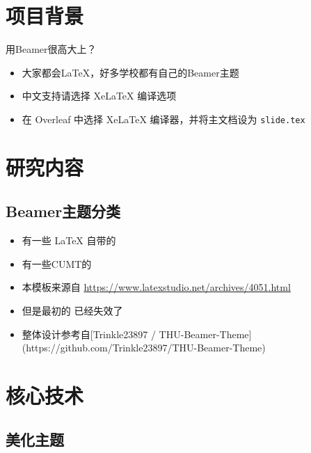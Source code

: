 \section{项目背景}

\begin{frame}{用Beamer很高大上？}
    \begin{itemize}[<+-| alert@+>] %
        \item 大家都会\LaTeX{}，好多学校都有自己的Beamer主题
        \item 中文支持请选择 Xe\LaTeX{} 编译选项
        \item 在 Overleaf 中选择 Xe\LaTeX{} 编译器，并将主文档设为 \texttt{slide.tex}
    \end{itemize}
\end{frame}


\section{研究内容}

\subsection{Beamer主题分类}

\begin{frame}[shrink=5]
    \begin{itemize}
        \item 有一些 \LaTeX{} 自带的
        \item 有一些CUMT的
        \item 本模板来源自 \newline \url{https://www.latexstudio.net/archives/4051.html}
        \item 但是最初的 \href{http://far.tooold.cn/post/latex/beamerdlut}{\color{purple}{link}} \cite{origin}已经失效了
        \item 整体设计参考自[Trinkle23897 / THU-Beamer-Theme](https://github.com/Trinkle23897/THU-Beamer-Theme)
    \end{itemize}
\end{frame}

\section{核心技术}

\subsection{美化主题}

